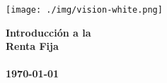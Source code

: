 \begin{titlepage}
\pagecolor{titlepagecolor}
\noindent
\texttt{[image: ./img/vision-white.png]}\\[-1em]
\color{white}
\makebox[0pt][l]{\rule{1.3\textwidth}{1pt}}
\par
\noindent
\Huge\textbf{Introducción a la} \\
\Huge\textbf{Renta Fija} \\ \\
\vfill
\noindent
\small{\textbf{\today}} \\ \\
\end{titlepage}
\restoregeometry %
\nopagecolor%
